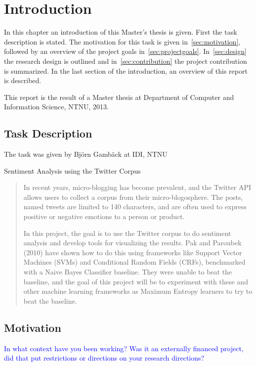 \chapter{Introduction}

In this chapter an introduction of this Master's thesis is given. First the task description is stated. The motivation for this task is given in~\autoref{sec:motivation}, followed by an overview of the project goals in~\autoref{sec:projectgoals}. In~\autoref{sec:design} the research design is outlined and in~\autoref{sec:contribution} the project contribution is summarized. In the last section of the introduction, an overview of this report is described. 

This report is the result of a Master thesis at Department of Computer and Information Science, NTNU, 2013. 

\section{Task Description}
\label{sec:task}

The task was given by Bj\"{o}rn Gamb\"{a}ck at IDI, NTNU

\begin{center} \Large Sentiment Analysis using the Twitter Corpus \end{center}
\begin{quotation}
In recent years, micro-blogging has become prevalent, and the Twitter API allows users to collect a corpus from their micro-blogosphere. The posts, named tweets are limited to 140 characters, and are often used to express positive or negative emotions to a person or product.

In this project, the goal is to use the Twitter corpus to do sentiment analysis and develop tools for visualizing the results. Pak and Paroubek (2010) have shown how to do this using frameworks like Support Vector Machines (SVMs) and Conditional Random Fields (CRFs), benchmarked with a Naive Bayes Classifier baseline. They were unable to beat the baseline, and the goal of this project will be to experiment with these and other machine learning frameworks as Maximum Entropy learners to try to beat the baseline.
\end{quotation}


\section{Motivation}
\label{sec:motivation}
\textcolor{blue}{In what context have you been working? Was it an externally financed project, did that put restrictions or directions on your research directions?}

